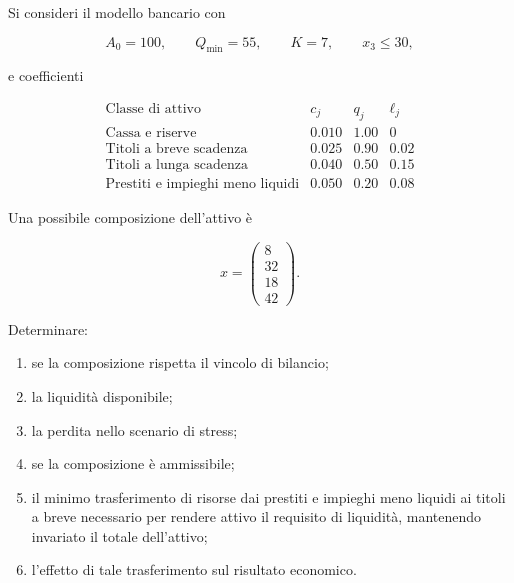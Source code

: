 \begin{exercise}

\label{ex:cap11-ammissibilita-correzione}

Si consideri il modello bancario con

\[
A_0=100,
\qquad
Q_{\min}=55,
\qquad
K=7,
\qquad
x_3\leq30,
\]

\noindent e coefficienti

\[
\begin{array}{c|ccc}
\text{Classe di attivo}
&
c_j
&
q_j
&
\ell_j
\\
\hline
\text{Cassa e riserve}
&
0.010
&
1.00
&
0
\\
\text{Titoli a breve scadenza}
&
0.025
&
0.90
&
0.02
\\
\text{Titoli a lunga scadenza}
&
0.040
&
0.50
&
0.15
\\
\text{Prestiti e impieghi meno liquidi}
&
0.050
&
0.20
&
0.08
\end{array}
\]

Una possibile composizione dell'attivo \`e

\[
x
=
\begin{pmatrix}
8\\
32\\
18\\
42
\end{pmatrix}.
\]

Determinare:

\begin{enumerate}

\item se la composizione rispetta il vincolo di bilancio;

\item la liquidit\`a disponibile;

\item la perdita nello scenario di stress;

\item se la composizione \`e ammissibile;

\item il minimo trasferimento di risorse dai prestiti e impieghi meno
liquidi ai titoli a breve necessario per rendere attivo il requisito di
liquidit\`a, mantenendo invariato il totale dell'attivo;

\item l'effetto di tale trasferimento sul risultato economico.

\end{enumerate}

\end{exercise}

